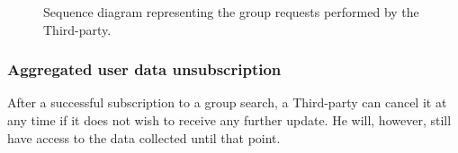             \begin{figure}[H]
                \centering
                \caption{Sequence diagram representing the group requests performed by the Third-party.}
                \label{fig:Group-request-sequence-diagram}
            \end{figure}
            
        \subsubsection{Aggregated user data unsubscription}
        After a successful subscription to a group search, a Third-party can cancel it at any time if it does not wish to receive any further update. He will, however, still have access to the data collected until that point.
        
